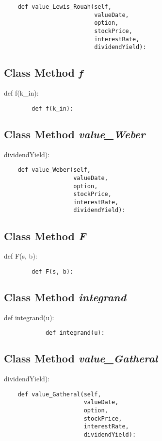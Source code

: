 \documentclass[twoside,11pt]{book}
\begin{document}
\begin{lstlisting}
    def value_Lewis_Rouah(self,
                          valueDate,
                          option,
                          stockPrice,
                          interestRate,
                          dividendYield):
\end{lstlisting}

\subsection{Class Method {\it f}}
def f(k\_in):

\begin{lstlisting}
        def f(k_in):
\end{lstlisting}

\subsection{Class Method {\it value\_Weber}}
dividendYield):

\begin{lstlisting}
    def value_Weber(self,
                    valueDate,
                    option,
                    stockPrice,
                    interestRate,
                    dividendYield):
\end{lstlisting}

\subsection{Class Method {\it F}}
def F(s, b):

\begin{lstlisting}
        def F(s, b):
\end{lstlisting}

\subsection{Class Method {\it integrand}}
def integrand(u):

\begin{lstlisting}
            def integrand(u):
\end{lstlisting}

\subsection{Class Method {\it value\_Gatheral}}
dividendYield):

\begin{lstlisting}
    def value_Gatheral(self,
                       valueDate,
                       option,
                       stockPrice,
                       interestRate,
                       dividendYield):
\end{lstlisting}
\end{document}
